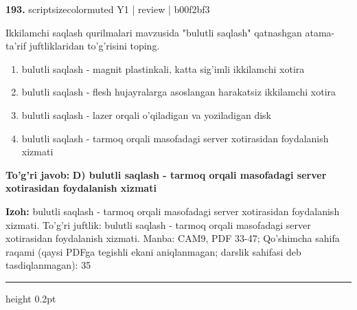 \documentclass[10pt,a4paper]{article}
\begin{document}
{\bfseries\sffamily\color{ink} 193.} {scriptsizecolor{muted} Y1 | review | b00f2bf3}
\par
Ikkilamchi saqlash qurilmalari mavzusida "bulutli saqlash" qatnashgan atama-ta'rif juftliklaridan to'g'risini toping.
\begin{enumerate}[label=\Alph*),leftmargin=9mm]
\item bulutli saqlash - magnit plastinkali, katta sig'imli ikkilamchi xotira
\item bulutli saqlash - flesh hujayralarga asoslangan harakatsiz ikkilamchi xotira
\item bulutli saqlash - lazer orqali o'qiladigan va yoziladigan disk
\item bulutli saqlash - tarmoq orqali masofadagi server xotirasidan foydalanish xizmati
\end{enumerate}
\begin{tcolorbox}[enhanced,breakable,colback=teal!4,colframe=teal!60!black,boxrule=0.45pt,arc=1.2mm,left=2.7mm,right=2.7mm,top=1.8mm,bottom=1.8mm,before skip=2mm,after skip=2mm]
{\bfseries\sffamily\color{teal}To'g'ri javob:} \textbf{D) bulutli saqlash - tarmoq orqali masofadagi server xotirasidan foydalanish xizmati}
\par\smallskip
{\bfseries Izoh:} bulutli saqlash - tarmoq orqali masofadagi server xotirasidan foydalanish xizmati. To'g'ri juftlik: bulutli saqlash - tarmoq orqali masofadagi server xotirasidan foydalanish xizmati. Manba: CAM9, PDF 33-47; Qo'shimcha sahifa raqami (qaysi PDFga tegishli ekani aniqlanmagan; darslik sahifasi deb tasdiqlanmagan): 35
\end{tcolorbox}
\vspace{2mm}\hrule height 0.2pt\vspace{3mm}
\end{document}
